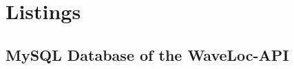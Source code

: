 \chapter{Listings}
\label{cha:listings}

\section{MySQL Database of the WaveLoc-API}
\label{sec:mysql_database_of_the_waveloc_api}
\newpage


